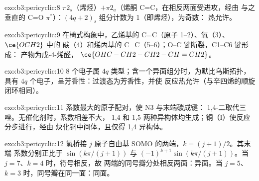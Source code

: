 \begin{solution}{exo:b3:pericyclic:8}
$\pi2_s$（烯烃）$+ \pi2_a$（烯酮 C=C，在相反两面受进攻，经由
与之垂直的 C=O $\pi^*$）：$(4q + 2)_s$ 组分计数为 1（即烯烃），为奇数：
热允许。
\end{solution}

\begin{solution}{exo:b3:pericyclic:9}
在椅式构象中，乙烯基的 C=C（原子 1--2）、氧（3）、$\ce{OCH2}$ 中的
碳（4）和烯丙基的 C=C（5--6）；O--C 键断裂，C1--C6 键形成：
产物为戊-4-烯醛，
$\ce{OHC-CH2-CH2-CH=CH2}$。
\end{solution}

\begin{solution}{exo:b3:pericyclic:10}
8 个电子属 $4q$ 类型；含一个异面组分时，为默比乌斯拓扑，
具有 $4q$ 个电子，呈芳香性：过渡态为芳香性，并使
反应热允许（与辛四烯的顺旋闭环相同）。
\end{solution}

\begin{solution}{exo:b3:pericyclic:11}
系数最大的原子配对，使 N3 与末端碳成键：
1,4-二取代三唑。无催化剂时，系数相差不大，
1,4 和 1,5 两种异构体均生成；铜（I）使反应分步进行，经由
炔化铜中间体，且仅得 1,4 异构体。
\end{solution}

\begin{solution}{exo:b3:pericyclic:12}
氢桥接 $j$ 原子自由基 SOMO 的两端，$k = (j + 1)/2$。其末端
系数分别正比于 $\sin(k\pi/(j + 1))$ 与 $(-1)^{k+1}\sin(k\pi/(j + 1))$。当 $j = 7$、$k = 4$ 时，符号相反，故
两端的同号瓣分处相反两面：异面。当
$j = 5$、$k = 3$ 时，同号瓣在同一面：同面。
\end{solution}

